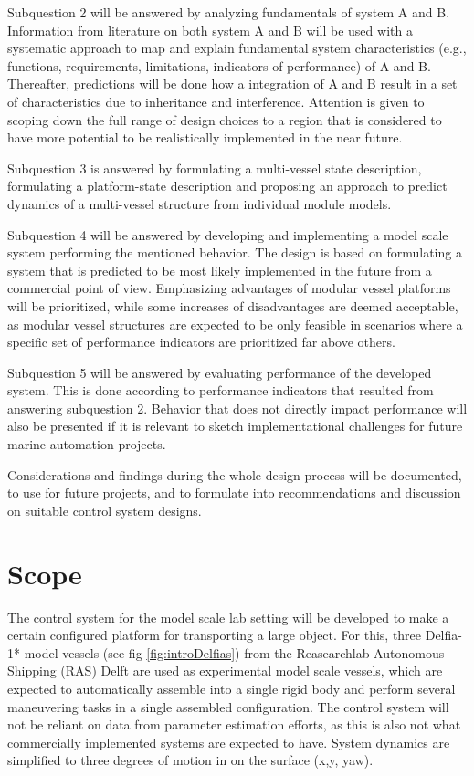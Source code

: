 Subquestion 2 will be answered by analyzing fundamentals of system A and B. Information from literature on both system A and B will be used with a systematic approach to map and explain fundamental system characteristics (e.g., functions, requirements, limitations, indicators of performance) of A and B. 
Thereafter, predictions will be done how a integration of A and B result in a set of characteristics due to inheritance and interference. Attention is given to scoping down the full range of design choices to a region that is considered to have more potential to be realistically implemented in the near future. 

Subquestion 3 is answered by formulating a multi-vessel state description, formulating a platform-state description and proposing an approach to predict dynamics of a multi-vessel structure from individual module models. 

Subquestion 4 will be answered by developing and implementing a model scale system performing the mentioned behavior. The design is based on formulating a system that is predicted to be most likely implemented in the future from a commercial point of view.  Emphasizing advantages of modular vessel platforms will be prioritized, while some increases of disadvantages are deemed acceptable, as modular vessel structures are expected to be only feasible in scenarios where a specific set of performance indicators are prioritized far above others. 

Subquestion 5 will be answered by evaluating performance of the developed system. This is done according to performance indicators that resulted from answering subquestion 2. Behavior that does not directly impact performance will also be presented if it is relevant to sketch implementational challenges for future marine automation projects. 

Considerations and findings during the whole design process will be documented, to use for future projects, and to formulate into recommendations and discussion on suitable control system designs.

\section{Scope}
The control system for the model scale lab setting will be developed to make a certain configured platform for transporting a large object. For this, three Delfia-1* model vessels (see fig \ref{fig:introDelfias}) from the Reasearchlab Autonomous Shipping (RAS) Delft are used as experimental model scale vessels, which are expected to automatically assemble into a single rigid body and perform several maneuvering tasks in a single assembled configuration. The control system will not be reliant on data from parameter estimation efforts, as this is also not what commercially implemented systems are expected to have. System dynamics are simplified to three degrees of motion in on the surface (x,y, yaw).

